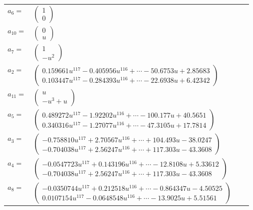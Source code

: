 \documentclass[1p]{elsarticle_modified}
\theoremstyle{definition}
\begin{document}
\begin{tabular}{m{7pt} m{180pt} m{7pt} m{180pt} }
\flushright $a_{6}=$&$\begin{pmatrix}1\\0\end{pmatrix}$ \\
\flushright $a_{10}=$&$\begin{pmatrix}0\\u\end{pmatrix}$ \\
\flushright $a_{7}=$&$\begin{pmatrix}1\\- u^2\end{pmatrix}$ \\
\flushright $a_{2}=$&$\begin{pmatrix}0.159661 u^{117}-0.405956 u^{116}+\cdots-50.6753 u+2.85683\\0.103447 u^{117}-0.284393 u^{116}+\cdots-22.6938 u+6.42342\end{pmatrix}$ \\
\flushright $a_{11}=$&$\begin{pmatrix}u\\- u^3+u\end{pmatrix}$ \\
\flushright $a_{5}=$&$\begin{pmatrix}0.489272 u^{117}-1.92202 u^{116}+\cdots-100.177 u+40.5651\\0.340316 u^{117}-1.27077 u^{116}+\cdots-47.3105 u+17.7814\end{pmatrix}$ \\
\flushright $a_{3}=$&$\begin{pmatrix}-0.758810 u^{117}+2.70567 u^{116}+\cdots+104.493 u-38.0247\\-0.704038 u^{117}+2.56247 u^{116}+\cdots+117.303 u-43.3608\end{pmatrix}$ \\
\flushright $a_{4}=$&$\begin{pmatrix}-0.0547723 u^{117}+0.143196 u^{116}+\cdots-12.8108 u+5.33612\\-0.704038 u^{117}+2.56247 u^{116}+\cdots+117.303 u-43.3608\end{pmatrix}$ \\
\flushright $a_{8}=$&$\begin{pmatrix}-0.0350744 u^{117}+0.212518 u^{116}+\cdots-0.864347 u-4.50525\\0.0107154 u^{117}-0.0648548 u^{116}+\cdots-13.9025 u+5.51561\end{pmatrix}$ \\

\end{tabular}
\end{document}

